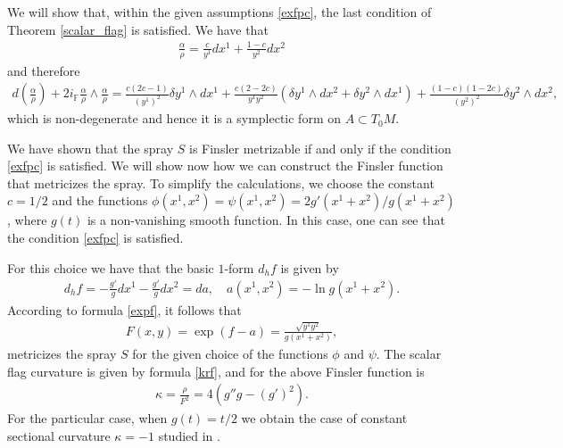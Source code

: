 \documentclass[oneside,english]{amsart}
\numberwithin{equation}{section}
\numberwithin{figure}{section}
\theoremstyle{plain}
\theoremstyle{plain}
\theoremstyle{definition}
\theoremstyle{plain}
\theoremstyle{plain}
\theoremstyle{plain}
\theoremstyle{remark}
\theoremstyle{remark}
\begin{document}
We will show that, within the given assumptions \eqref{exfpc}, the
last condition of Theorem \ref{scalar_flag} is satisfied. We have that 
\begin{eqnarray*}
  \frac{\alpha}{\rho} = \frac{c}{y^1}dx^1 + \frac{1-c}{y^2}dx^2 \end{eqnarray*}
and therefore 
\begin{eqnarray*}
  d\left(\frac{\alpha}{\rho}\right) + 2i_{\mathbb F}
  \frac{\alpha}{\rho}\wedge \frac{\alpha}{\rho} =
  \frac{c(2c-1)}{(y^1)^2} \delta y^1 \wedge dx^1 +
  \frac{c(2-2c)}{y^1y^2}(\delta y^1 \wedge dx^2 + \delta y^2 \wedge
  dx^1) + \frac{(1-c)(1-2c)}{(y^2)^2} \delta y^2\wedge dx^2,
\end{eqnarray*} which is non-degenerate and hence it is a symplectic
form on $A\subset T_0M$. 

We have shown that the spray $S$ is Finsler metrizable if and only if
the condition \eqref{exfpc} is satisfied. We will show now how we can
construct the Finsler function that metricizes the spray. To simplify
the calculations, we choose the constant $c=1/2$ and the functions
$\phi(x^1, x^2)=\psi(x^1, x^2)=2g'(x^1+x^2)/g(x^1+x^2)$, where $g(t)$ is a
non-vanishing smooth function. In this case, one can see that the condition
\eqref{exfpc} is satisfied. 

For this choice we have that the basic $1$-form $d_hf$ is given by  
\begin{eqnarray*} d_hf= - \frac{g'}{g} dx^1 - \frac{g'}{g} dx^2
  = da, \quad a(x^1, x^2) = -\ln g(x^1+x^2). \end{eqnarray*}  
According to formula \eqref{expf}, it follows that 
\begin{eqnarray*}
  F(x,y)=\exp(f-a)=\frac{\sqrt{y^1y^2}}{g(x^1+x^2)}, \end{eqnarray*}
metricizes the spray $S$ for the given choice of the functions $\phi$ and
$\psi$. The scalar flag curvature is given by formula \eqref{krf}, and
for the above Finsler function is 
\begin{eqnarray*}
  \kappa = \frac{\rho}{F^2}= 4(g''g-(g')^2). \end{eqnarray*}
For the particular case, when $g(t)=t/2$ we obtain the case of constant
sectional curvature $\kappa=-1$ studied in \cite[\S 5.4]{BM13}.
\end{document}
